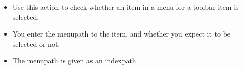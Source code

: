 
\begin{itemize}
\item Use this action to check whether an item in a menu for a toolbar item is selected.
\item You enter the menupath to the item, and whether you expect it to be selected or not.
\item The menupath is given as an indexpath. 
\end{itemize}

